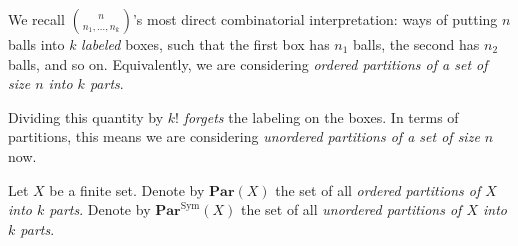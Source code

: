 \documentclass{article}
\DeclareMathOperator{\Sym}{Sym}
\begin{document}
We recall $\displaystyle\binom{n}{n_1,\ldots,n_k}$'s most direct combinatorial interpretation: ways of putting $n$ balls into $k$ \textit{labeled} boxes, such that the first box has $n_1$ balls, the second has $n_2$ balls, and so on.
Equivalently, we are considering \textit{ordered partitions of a set of size $n$ into $k$ parts}.

Dividing this quantity by $k!$ \textit{forgets} the labeling on the boxes.
In terms of partitions, this means we are considering \textit{unordered partitions of a set of size $n$} now.

\begin{definition}
    Let $X$ be a finite set.
    Denote by $\mathbf{Par}(X)$ the set of all \textit{ordered partitions of $X$ into $k$ parts}.
    Denote by $\mathbf{Par}^{\Sym}(X)$ the set of all \textit{unordered partitions of $X$ into $k$ parts}.
\end{definition}
\end{document}
